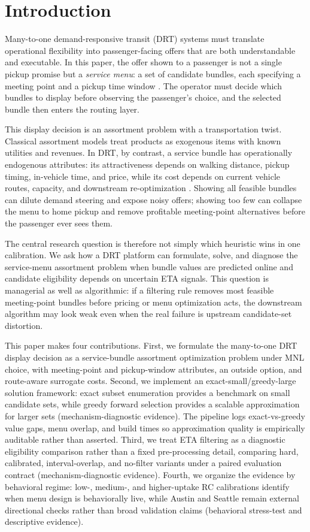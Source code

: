 \section{Introduction}

Many-to-one demand-responsive transit (DRT) systems must translate operational flexibility into passenger-facing offers that are both understandable and executable. In this paper, the offer shown to a passenger is not a single pickup promise but a \emph{service menu}: a set of candidate bundles, each specifying a meeting point and a pickup time window \citep{stiglic2015benefits,fielbaum2021ondemand}. The operator must decide which bundles to display before observing the passenger's choice, and the selected bundle then enters the routing layer.

This display decision is an assortment problem with a transportation twist. Classical assortment models treat products as exogenous items with known utilities and revenues. In DRT, by contrast, a service bundle has operationally endogenous attributes: its attractiveness depends on walking distance, pickup timing, in-vehicle time, and price, while its cost depends on current vehicle routes, capacity, and downstream re-optimization \citep{agatz2012optimization}. Showing all feasible bundles can dilute demand steering and expose noisy offers; showing too few can collapse the menu to home pickup and remove profitable meeting-point alternatives before the passenger ever sees them.

The central research question is therefore not simply which heuristic wins in one calibration. We ask how a DRT platform can formulate, solve, and diagnose the service-menu assortment problem when bundle values are predicted online and candidate eligibility depends on uncertain ETA signals. This question is managerial as well as algorithmic: if a filtering rule removes most feasible meeting-point bundles before pricing or menu optimization acts, the downstream algorithm may look weak even when the real failure is upstream candidate-set distortion.

This paper makes four contributions. First, we formulate the many-to-one DRT display decision as a service-bundle assortment optimization problem under MNL choice, with meeting-point and pickup-window attributes, an outside option, and route-aware surrogate costs. Second, we implement an exact-small/greedy-large solution framework: exact subset enumeration provides a benchmark on small candidate sets, while greedy forward selection provides a scalable approximation for larger sets (mechanism-diagnostic evidence). The pipeline logs exact-vs-greedy value gaps, menu overlap, and build times so approximation quality is empirically auditable rather than asserted. Third, we treat ETA filtering as a diagnostic eligibility comparison rather than a fixed pre-processing detail, comparing hard, calibrated, interval-overlap, and no-filter variants under a paired evaluation contract (mechanism-diagnostic evidence). Fourth, we organize the evidence by behavioral regime: low-, medium-, and higher-uptake RC calibrations identify when menu design is behaviorally live, while Austin and Seattle remain external directional checks rather than broad validation claims (behavioral stress-test and descriptive evidence).

